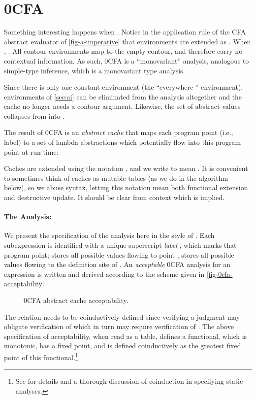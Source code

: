 \section{0CFA}
\label{sec:0cfa}

Something interesting happens when .  Notice in the application
rule of the CFA abstract evaluator of \autoref{fig-a-imperative}
that environments are extended as .  When ,
.  All contour environments map to
the empty contour, and therefore carry no contextual information.  As
such, 0CFA is a ``monovariant'' analysis, analogous to simple-type
inference, which is a monovariant type analysis.

Since there is only one constant environment (the ``everywhere
'' environment), environments of \autoref{sec:ai} can be
eliminated from the analysis altogether and the cache no longer needs
a contour argument.  Likewise, the set of abstract values collapses
from  into .

The result of 0CFA is an {\em abstract cache} that maps each program
point (i.e., label) to a set of lambda abstractions which potentially
flow into this program point at run-time:

Caches are extended using the notation , and
we write  to mean .  It is convenient to sometimes think of caches
as mutable tables (as we do in the algorithm below), so we abuse
syntax, letting this notation mean both functional extension and
destructive update.  It should be clear from context which is implied.

\paragraph{The Analysis:} We present the specification of the analysis
here in the style of \citet{nielson-nielson-hankin}.  Each
subexpression is identified with a unique superscript {\em label}
, which marks that program point;  stores all
possible values flowing to point ,  stores all
possible values flowing to the definition site of .  An {\em
  acceptable} 0CFA analysis for an expression  is written
 and derived according to the scheme given in
\autoref{fig-0cfa-acceptability}.

\begin{figure}[h]

\caption{0CFA abstract cache acceptability.}
\label{fig-0cfa-acceptability}
\end{figure}

The  relation needs to be coinductively defined since
verifying a judgment  may obligate
verification of  which in turn may require
verification of .  The above specification of
acceptability, when read as a table, defines a functional, which is
monotonic, has a fixed point, and  is defined coinductively
as the greatest fixed point of this functional.\footnote{See
  \citet{nielson-nielson-hankin} for details and a thorough discussion
  of coinduction in specifying static analyses.}

